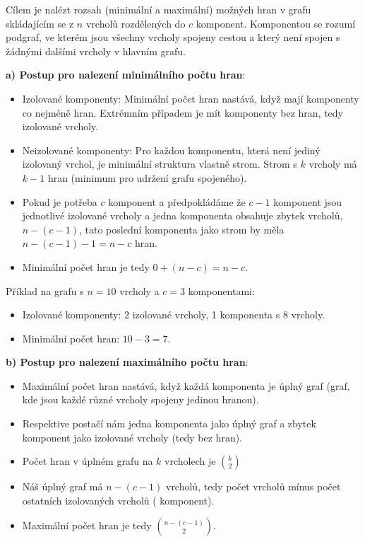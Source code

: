 \documentclass[10pt, a4paper]{ReportSheet}
\begin{document}
    Cílem je nalézt rozsah (minimální a maximální) možných hran v grafu skládajícím se z $n$ vrcholů rozdělených do $
    c$ komponent. Komponentou se rozumí podgraf, ve kterém jsou všechny vrcholy spojeny cestou a který není spojen s
    žádnými dalšími vrcholy v hlavním grafu.

    \textbf{a) Postup pro nalezení minimálního počtu hran}:
    \begin{itemize}
        \item Izolované komponenty: Minimální počet hran nastává, když mají komponenty co nejméně hran. Extrémním
        případem je mít komponenty bez hran, tedy izolované vrcholy.
        \item Neizolované komponenty: Pro každou komponentu, která není jediný izolovaný vrchol, je minimální
        struktura vlastně strom. Strom s $k$ vrcholy má $k-1$ hran (minimum pro udržení grafu spojeného).
        \item Pokud je potřeba $c$ komponent a předpokládáme že $c-1$ komponent jsou jednotlivé izolované vrcholy a jedna komponenta obsahuje zbytek vrcholů, $n-(c-1)$, tato poslední komponenta jako strom by měla $n-(c-1)-1=n-c$ hran.
        \item Minimální počet hran je tedy $0 + (n-c) = n-c$.
    \end{itemize}

    Příklad na grafu s $n=10$ vrcholy a $c=3$ komponentami:
    \begin{itemize}
        \item Izolované komponenty: 2 izolované vrcholy, 1 komponenta s 8 vrcholy.
        \item Minimální počet hran: $10 - 3 = 7$.
    \end{itemize}


    \textbf{b) Postup pro nalezení maximálního počtu hran}:
    \begin{itemize}
        \item Maximální počet hran nastává, když každá komponenta je úplný graf (graf, kde jsou každé různé vrcholy spojeny jedinou hranou).
        \item Respektive postačí nám jedna komponenta jako úplný graf a zbytek komponent jako izolované vrcholy (tedy
        bez hran).
        \item Počet hran v úplném grafu na $k$ vrcholech je $\binom{k}{2}$
        \item Náš úplný graf má $n-(c-1)$ vrcholů, tedy počet vrcholů mínus počet ostatních izolovaných vrcholů (
        komponent).
        \item Maximální počet hran je tedy $\binom{n-(c-1)}{2}$.
    \end{itemize}
\end{document}
